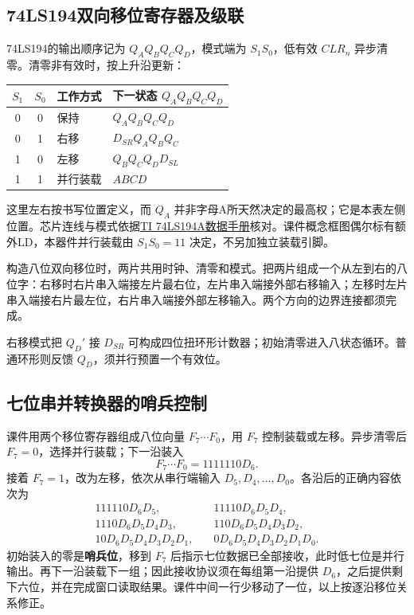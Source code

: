 \documentclass[UTF8,fontset=none,zihao=-4,a4paper]{ctexart}
\newcommand{\term}[1]{\textbf{#1}}
\begin{document}
\subsection{74LS194双向移位寄存器及级联}
74LS194的输出顺序记为 $Q_AQ_BQ_CQ_D$，模式端为 $S_1S_0$，低有效 $CLR_n$ 异步清零。清零非有效时，按上升沿更新：
\begin{center}
\begin{tabular}{cc l l}
\toprule $S_1$&$S_0$&工作方式&下一状态 $Q_AQ_BQ_CQ_D$\\\midrule
0&0&保持&$Q_AQ_BQ_CQ_D$\\
0&1&右移&$D_{SR}Q_AQ_BQ_C$\\
1&0&左移&$Q_BQ_CQ_DD_{SL}$\\
1&1&并行装载&$ABCD$\\\bottomrule
\end{tabular}
\end{center}
这里左右按书写位置定义，而 $Q_A$ 并非字母A所天然决定的最高权；它是本表左侧位置。芯片连线与模式依据\href{https://www.ti.com/lit/ds/symlink/sn74ls194a.pdf}{TI 74LS194A数据手册}核对。课件概念框图偶尔标有额外LD，本器件并行装载由 $S_1S_0=11$ 决定，不另加独立装载引脚。

构造八位双向移位时，两片共用时钟、清零和模式。把两片组成一个从左到右的八位字：右移时右片串入端接左片最右位，左片串入端接外部右移输入；左移时左片串入端接右片最左位，右片串入端接外部左移输入。两个方向的边界连接都须完成。

右移模式把 $Q_D'$ 接 $D_{SR}$ 可构成四位扭环形计数器；初始清零进入八状态循环。普通环形则反馈 $Q_D$，须并行预置一个有效位。

\subsection{七位串并转换器的哨兵控制}
课件用两个移位寄存器组成八位向量 $F_7\cdots F_0$，用 $F_7$ 控制装载或左移。异步清零后 $F_7=0$，选择并行装载；下一沿装入
\[
F_7\cdots F_0=1111110D_6.
\]
接着 $F_7=1$，改为左移，依次从串行端输入 $D_5,D_4,\ldots,D_0$。各沿后的正确内容依次为
\begin{align*}
111110D_6D_5,&\quad11110D_6D_5D_4,\\
1110D_6D_5D_4D_3,&\quad110D_6D_5D_4D_3D_2,\\
10D_6D_5D_4D_3D_2D_1,&\quad0D_6D_5D_4D_3D_2D_1D_0.
\end{align*}
初始装入的零是\term{哨兵位}，移到 $F_7$ 后指示七位数据已全部接收，此时低七位是并行输出。再下一沿装载下一组；因此接收协议须在每组第一沿提供 $D_6$，之后提供剩下六位，并在完成窗口读取结果。课件中间一行少移动了一位，以上按逐沿移位关系修正。
\end{document}
